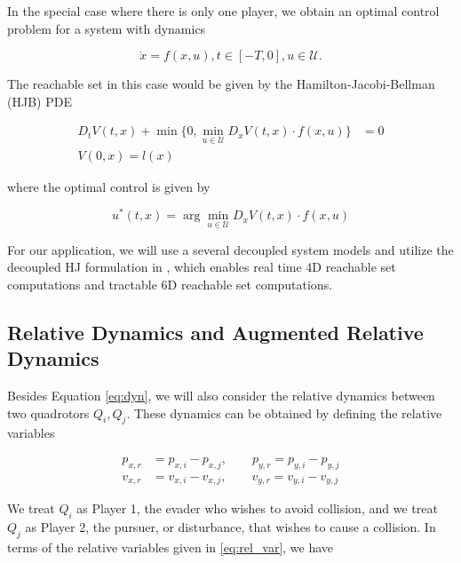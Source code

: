 In the special case where there is only one player, we obtain an optimal control problem for a system with dynamics

\begin{equation} \label{eq:dyn_d}
\dot{x} = f(x, u), t\in [-T,0], u\in\mathcal U.
\end{equation}

The reachable set in this case would be given by the Hamilton-Jacobi-Bellman (HJB) PDE

\begin{equation} \label{eq:HJBPDE}
\begin{aligned}
D_t V(t,x) + \min \{0, \min_{u\in\mathcal{U}} D_x V(t,x) \cdot f(x,u)\} &= 0 \\
V(0,x) = l(x)&
\end{aligned}
\end{equation}

\noindent where the optimal control is given by

\begin{equation} \label{eq:HJB_ctrl_syn}
u^*(t,x) = \arg \min_{u\in\mathcal{U}} D_x V(t,x) \cdot f(x,u)
\end{equation}

For our application, we will use a several decoupled system models and utilize the decoupled HJ formulation in \cite{Chen15}, which enables real time 4D reachable set computations and tractable 6D reachable set computations.

\subsection{Relative Dynamics and Augmented Relative Dynamics}
Besides Equation \eqref{eq:dyn}, we will also consider the relative dynamics between two quadrotors $Q_i,Q_j$. These dynamics can be obtained by defining the relative variables

\begin{equation} \label{eq:rel_var}
\begin{aligned}
p_{x,r} &= p_{x,i} - p_{x,j}, \qquad p_{y,r} = p_{y,i} - p_{y,j}\\
v_{x,r} &= v_{x,i} - v_{x,j}, \qquad v_{y,r} = v_{y,i} - v_{y,j}
\end{aligned}
\end{equation}

We treat $Q_i$ as Player 1, the evader who wishes to avoid collision, and we treat $Q_j$ as Player 2, the pursuer, or disturbance, that wishes to cause a collision. In terms of the relative variables given in \eqref{eq:rel_var}, we have 

